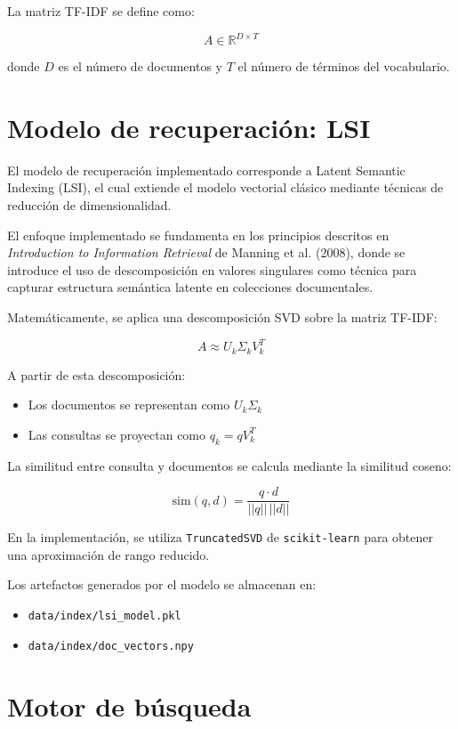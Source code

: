 \documentclass[12pt]{article}
\begin{document}
	La matriz TF-IDF se define como:
	
	\[
	A \in \mathbb{R}^{D \times T}
	\]
	
	donde $D$ es el número de documentos y $T$ el número de términos del vocabulario.
	
	\section{Modelo de recuperación: LSI}
	
	El modelo de recuperación implementado corresponde a Latent Semantic Indexing (LSI), el cual extiende el modelo vectorial clásico mediante técnicas de reducción de dimensionalidad.
	
	El enfoque implementado se fundamenta en los principios descritos en \textit{Introduction to Information Retrieval} de Manning et al. (2008), donde se introduce el uso de descomposición en valores singulares como técnica para capturar estructura semántica latente en colecciones documentales.
	
	Matemáticamente, se aplica una descomposición SVD sobre la matriz TF-IDF:
	
	\[
	A \approx U_k \Sigma_k V_k^T
	\]
	
	A partir de esta descomposición:
	
	\begin{itemize}
		\item Los documentos se representan como $U_k \Sigma_k$
		\item Las consultas se proyectan como $q_k = q V_k^T$
	\end{itemize}
	
	La similitud entre consulta y documentos se calcula mediante la similitud coseno:
	
	\[
	\text{sim}(q, d) = \frac{q \cdot d}{||q|| \, ||d||}
	\]
	
	En la implementación, se utiliza \texttt{TruncatedSVD} de \texttt{scikit-learn} para obtener una aproximación de rango reducido.
	
	Los artefactos generados por el modelo se almacenan en:
	
	\begin{itemize}
		\item \texttt{data/index/lsi\_model.pkl}
		\item \texttt{data/index/doc\_vectors.npy}
	\end{itemize}
	
	\section{Motor de búsqueda}
	
\end{document}
